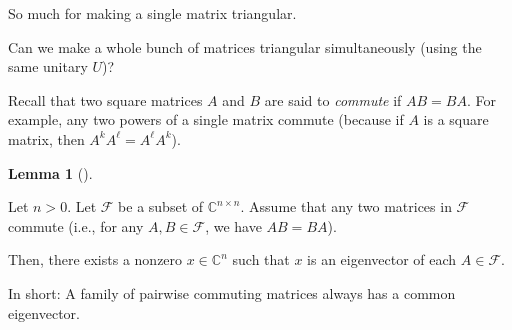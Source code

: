\documentclass[numbers=enddot,12pt,final,onecolumn,notitlepage]{scrartcl}%
\numberwithin{exer}{subsection}
\theoremstyle{definition}
\newtheorem{lem}[theo]{Lemma}
\newenvironment{lemma}[1][]
{\begin{lem}[#1]\begin{leftbar}}
{\end{leftbar}\end{lem}}
\begin{document}
So much for making a single matrix triangular.

Can we make a whole bunch of matrices triangular simultaneously (using the
same unitary $U$)?

Recall that two square matrices $A$ and $B$ are said to \emph{commute} if
$AB=BA$. For example, any two powers of a single matrix commute (because if
$A$ is a square matrix, then $A^{k}A^{\ell}=A^{\ell}A^{k}$).

\begin{lemma}
Let $n>0$. Let $\mathcal{F}$ be a subset of $\mathbb{C}^{n\times n}$. Assume
that any two matrices in $\mathcal{F}$ commute (i.e., for any $A,B\in
\mathcal{F}$, we have $AB=BA$).

Then, there exists a nonzero $x\in\mathbb{C}^{n}$ such that $x$ is an
eigenvector of each $A\in\mathcal{F}$.
\end{lemma}

In short: A family of pairwise commuting matrices always has a common eigenvector.
\end{document}
